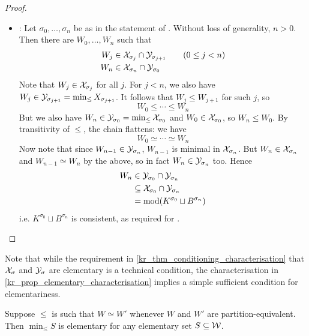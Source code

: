 \begin{proof}
\begin{itemize}
    \item \acyc{}: Let $\sigma_0, \ldots, \sigma_n$ be as in the statement
          of \acyc{}. Without loss of generality, $n > 0$. Then there are
          $W_0, \ldots, W_n$ such that
          \begin{align*}
            W_j &\in \mathcal{X}_{\sigma_j} \cap \mathcal{Y}_{\sigma_{j+1}} \qquad (0 \le j < n) \\
            W_n &\in \mathcal{X}_{\sigma_n} \cap \mathcal{Y}_{\sigma_0}
          \end{align*}
          Note that $W_j \in \mathcal{X}_{\sigma_j}$ for all $j$. For $j < n$, we also
          have $W_j \in \mathcal{Y}_{\sigma_{j+1}} = \min_{\le}{X_{\sigma_{j+1}}}$. It
          follows that $W_j \le W_{j+1}$ for such $j$, so
          \[
            W_0 \le \cdots \le W_n
          \]
          But we also have $W_n \in \mathcal{Y}_{\sigma_0} = \min_{\le}{\mathcal{X}_{\sigma_0}}$
          and $W_0 \in \mathcal{X}_{\sigma_0}$, so $W_n \le W_0$. By transitivity of
          $\le$, the chain flattens: we have
          \[
            W_0 \simeq \cdots \simeq W_n
          \]
          Now note that since $W_{n-1} \in \mathcal{Y}_{\sigma_n}$, $W_{n - 1}$ is
          minimal in $\mathcal{X}_{\sigma_n}$. But $W_n \in \mathcal{X}_{\sigma_n}$ and $W_{n -
          1} \simeq W_n$ by the above, so in fact $W_n \in \mathcal{Y}_{\sigma_n}$ too.
          Hence
          \begin{align*}
            W_n
            &\in \mathcal{Y}_{\sigma_0} \cap \mathcal{Y}_{\sigma_n} \\
            &\subseteq \mathcal{X}_{\sigma_0} \cap \mathcal{Y}_{\sigma_n} \\
            &= \operatorname{mod}(K^{\sigma_0} \sqcup B^{\sigma_n})
          \end{align*}
          i.e. $K^{\sigma_0} \sqcup B^{\sigma_n}$ is consistent, as required
          for \acyc{}.
\end{itemize}

\end{proof}

Note that while the requirement in \cref{kr_thm_conditioning_characterisation}
that $\mathcal{X}_{\sigma}$ and $\mathcal{Y}_{\sigma}$ are elementary is a technical
condition,\footnotemark{} the characterisation in
\cref{kr_prop_elementary_characterisation} implies a simple sufficient condition
for elementariness.
%

\begin{proposition}
    \label{kr_prop_partition_equiv_tpo_implies_elementariness}
    Suppose $\le$ is such that $W \simeq W'$ whenever $W$ and $W'$ are
    partition-equivalent. Then $\min_{\le}{S}$ is elementary for any
    elementary set $S \subseteq \mathcal{W}$.
\end{proposition}

